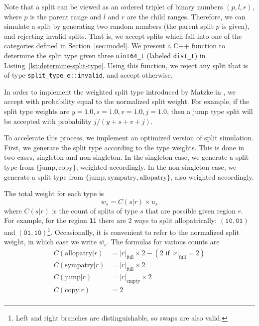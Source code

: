 \documentclass[a4paper]{article}
\newcommand{\CountFull}[1]{|#1|_\text{full}}
\newcommand{\CountEmpty}[1]{|#1|_\text{empty}}
\begin{document}
Note that a split can be viewed as an ordered triplet of binary numbers \(
(p,l,r) \), where $p$ is the parent range and $l$ and $r$ are the child ranges.
Therefore, we can simulate a split by generating two random numbers (the parent
split $p$ is given), and rejecting invalid splits.
That is, we accept splits which fall into one of the categories defined in
Section~\ref{sec:model}.
We present a C++ function to determine the split type given three
\texttt{uint64_t} (labeled \texttt{dist_t}) in
Listing~\ref{lst:determine-split-type}.
Using this function, we reject any split that is of type
\texttt{split_type_e::invalid}, and accept otherwise.

In order to implement the weighted split type introduced by Matzke in
\cite{ModelSelectionMatzke2014}, we accept with probability equal to the
normalized split weight.
For example, if the split type weights are $y = 1.0, s = 1.0, v = 1.0, j=1.0$,
then a jump type split will be accepted with probability $j/(y + s + v +
j)$.

To accelerate this process, we implement an optimized version of split
simulation.
First, we generate the split type according to the type weights.
This is done in two cases, singleton and non-singleton.
In the singleton case, we generate a split type from $\{\text{jump},
\text{copy}\}$, weighted accordingly.
In the non-singleton case, we generate a split type from $\{\text{jump},
\text{sympatry}, \text{allopatry}\}$, also weighted accordingly.

The total weight for each type is
\begin{equation}
	w_s = C(s|r) \times u_s
\end{equation}
where $C(s|r)$ is the count of splits of type $s$ that are
possible given region $r$.
For example, for the region \texttt{11} there are 2 ways to split
allopatrically: $(\texttt{10}, \texttt{01})$ and $(\texttt{01},
\texttt{10})$\footnote{Left and right branches are distinguishable, so swaps
	are also valid.}\footnotemark.
Occasionally, it is convenient to refer to the normalized split weight, in
which case we write \( \overline{w_s} \).
The formulas for various counts are
\begin{align*}
  C(\text{allopatry}|r) & =
  \CountFull{r} \times 2 - (2 \text{ if } \CountFull{r} = 2) \\
  C(\text{sympatry}|r)  & = \CountFull{r} \times 2           \\ C(\text{jump}|r) & =
  \CountEmpty{r} \times 2                                    \\ C(\text{copy}|r) & = 2 \\
\end{align*}
\end{document}
